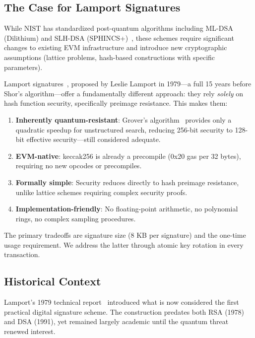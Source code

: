 \documentclass[11pt,a4paper]{article}
\begin{document}
\subsection{The Case for Lamport Signatures}

While NIST has standardized post-quantum algorithms including ML-DSA (Dilithium) and SLH-DSA (SPHINCS+)~\cite{nist2024}, these schemes require significant changes to existing EVM infrastructure and introduce new cryptographic assumptions (lattice problems, hash-based constructions with specific parameters).

Lamport signatures~\cite{lamport1979}, proposed by Leslie Lamport in 1979---a full 15 years before Shor's algorithm---offer a fundamentally different approach: they rely \emph{solely} on hash function security, specifically preimage resistance. This makes them:

\begin{enumerate}[leftmargin=*]
    \item \textbf{Inherently quantum-resistant}: Grover's algorithm~\cite{grover1996} provides only a quadratic speedup for unstructured search, reducing 256-bit security to 128-bit effective security---still considered adequate.
    \item \textbf{EVM-native}: keccak256 is already a precompile (0x20 gas per 32 bytes), requiring no new opcodes or precompiles.
    \item \textbf{Formally simple}: Security reduces directly to hash preimage resistance, unlike lattice schemes requiring complex security proofs.
    \item \textbf{Implementation-friendly}: No floating-point arithmetic, no polynomial rings, no complex sampling procedures.
\end{enumerate}

The primary tradeoffs are signature size (8 KB per signature) and the one-time usage requirement. We address the latter through atomic key rotation in every transaction.

\subsection{Historical Context}

Lamport's 1979 technical report~\cite{lamport1979} introduced what is now considered the first practical digital signature scheme. The construction predates both RSA (1978) and DSA (1991), yet remained largely academic until the quantum threat renewed interest.
\end{document}
